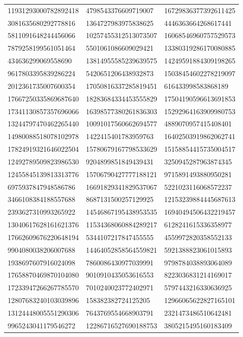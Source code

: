 \begin{longtable}{*{3}{l}}
11931293000782892418&4798543376609719007&16729836377392611425\\
3081635680292778816&1364727983975838625&4446363664268617441\\
5811091648244456066&10257455312513073507&16068546960757529573\\
7879258199561051464&5501061086609029421&13380319286170080885\\
434636299069558690&13814955585239639575&14249591884309198265\\
9617803395839286224&5420651206438932873&15038454602278219097\\
2012361735007600354&17050816337285819451&616433998583868189\\
17667250335869687640&18283684334453555829&17504190596613691853\\
17341130857357696066&16398577380261836303&15292964163909980753\\
13244797470462265440&10091017560662694577&4889070957415408401\\
14980088518078102978&1422415401783959763&16402503919862062741\\
17824919321646022504&15780679167798533629&15158854415735004517\\
12492789509823986530&9204899851849439431&3250945287963874345\\
12455845139813313776&15706790427777188121&9715891493880950281\\
6975937847948586786&16691829341829537067&5221023116068572237\\
3466108384188557688&8687131500257129925&12153239884445687613\\
2393627310993265922&14546867195438953535&16940494506432219457\\
13040617628161621376&11534368060884289217&6128241615336358977\\
17662609676220648194&5344107217847455555&4559972820358552133\\
9904080038206007688&14464052858564559821&5921388823061015893\\
1938697607916024098&7860086430977039991&9798784038893064089\\
17658870469870104080&9010910435053616553&8223036831214169017\\
17233947266267785570&7010240023772402971&5797443216330636925\\
12807683240103039896&158382382724125205&12966065622827165101\\
13124448005551290306&7643769554668903791&2321473486510642481\\
9965243041179546272&12286716527690188753&3805215495160183409\\

\end{longtable}
